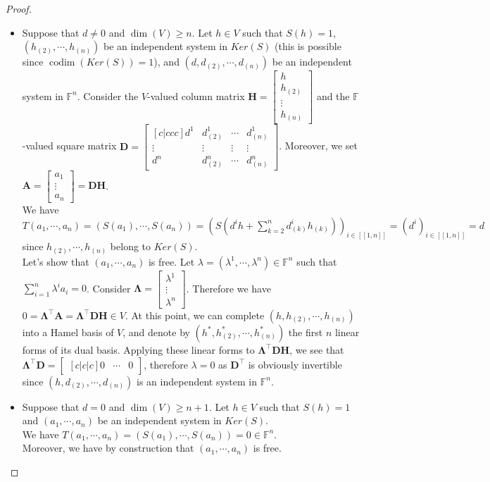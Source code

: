 \documentclass[a4paper,12pt]{article}
\DeclareMathOperator{\codim}{codim}
\theoremstyle{plain}
\theoremstyle{definition}
\theoremstyle{remark}
\begin{document}
\begin{proof}
\begin{itemize}
\item Suppose that $d \neq 0$ and $\dim(V) \geq n$. Let $h \in V$ such that $S(h) = 1$, $(h_{(2)}, \cdots, h_{(n)})$ be an independent system in $Ker(S)$ (this is possible since $\codim(Ker(S)) = 1$), and $(d, d_{(2)},\cdots,d_{(n)})$ be an independent system in $\mathbb{F}^n$. Consider the $V$-valued column matrix $\textbf{H} = \begin{bmatrix} h \\ h_{(2)} \\ \vdots \\ h_{(n)} \end{bmatrix}$ and the $\mathbb{F}$-valued square matrix $\textbf{D} = \begin{bmatrix} [c|ccc] d^1 & d_{(2)}^1 & \cdots & d_{(n)}^1  \\ \vdots & \vdots & \vdots & \vdots \\  d^n & d_{(2)}^n & \cdots & d_{(n)}^n  \end{bmatrix}$. Moreover, we set $\mathbf{A} = \begin{bmatrix} a_1 \\ \vdots \\ a_n \end{bmatrix} = \mathbf{D} \mathbf{H}$. \\
We have $T(a_1,\cdots,a_n) = (S(a_1), \cdots, S(a_n)) = (S(d^i h + \sum_{k=2}^n d_{(k)}^i h_{(k)}))_{i \in [\![1,n]\!]} = (d^i)_{i \in [\![1,n]\!]} = d$ since $h_{(2)}, \cdots, h_{(n)}$ belong to $Ker(S)$. \\
Let's show that $(a_1,\cdots,a_n)$ is free. Let $\lambda = (\lambda^1,\cdots,\lambda^n) \in \mathbb{F}^n$ such that $\sum_{i=1}^n  \lambda^i a_i = 0$. Consider $\mathbf{\Lambda} = \begin{bmatrix} \lambda^1 \\ \vdots \\ \lambda^n \end{bmatrix}$. Therefore we have $0 = \mathbf{\Lambda}^\top \mathbf{A} = \mathbf{\Lambda}^\top \mathbf{D} \mathbf{H} \in V$. At this point, we can complete $(h,h_{(2)}, \cdots, h_{(n)})$ into a Hamel basis of $V$, and denote by $(h^*,h_{(2)}^*, \cdots, h_{(n)}^*)$ the first $n$ linear forms of its dual basis. Applying these linear forms to $\mathbf{\Lambda}^\top \mathbf{D} \mathbf{H}$, we see that $\mathbf{\Lambda}^\top \mathbf{D} = \begin{bmatrix} [c|c|c] 0 & \cdots & 0 \end{bmatrix}$, therefore $\lambda = 0$ as $\mathbf{D}^\top$ is obviously invertible since $(h, d_{(2)},\cdots,d_{(n)})$ is an independent system in $\mathbb{F}^n$.
\item Suppose that $d = 0$ and $\dim(V) \geq n+1$. Let $h \in V$ such that $S(h) = 1$ and $(a_1, \cdots,a_n)$ be an independent system in $Ker(S)$. \\
We have $T(a_1,\cdots,a_n) = (S(a_1),\cdots,S(a_n)) = 0 \in \mathbb{F}^n$. \\
Moreover, we have by construction that $(a_1,\cdots,a_n)$ is free.
\end{itemize}
\end{proof}
\end{document}
